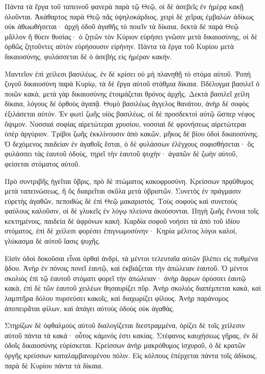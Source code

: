 {Πάντα τὰ ἔργα τοῦ ταπεινοῦ φανερὰ παρὰ τῷ Θεῷ, οἱ δὲ ἀσεβεῖς ἐν ἡμέρᾳ κακῇ ὀλοῦνται.
Ἀκάθαρτος παρὰ Θεῷ πᾶς ὑψηλοκάρδιος, χειρὶ δὲ χεῖρας ἐμβαλὼν ἀδίκως οὐκ ἀθωωθήσεται·
ἀρχὴ ὁδοῦ ἀγαθῆς τὸ ποιεῖν τὰ δίκαια, δεκτὰ δὲ παρὰ Θεῷ μᾶλλον ἢ θύειν θυσίας·
ὁ ζητῶν τὸν Κύριον εὑρήσει γνῶσιν μετὰ δικαιοσύνης, οἱ δὲ ὀρθῶς ζητοῦντες αὐτὸν εὑρήσουσιν εἰρήνην.
Πάντα τὰ ἔργα τοῦ Κυρίου μετὰ δικαιοσύνης, φυλάσσεται δὲ ὁ ἀσεβὴς εἰς ἡμέραν κακήν.
\par }{\PP {}Μαντεῖον ἐπὶ χείλεσι βασιλέως, ἐν δὲ κρίσει οὐ μὴ πλανηθῇ τὸ στόμα αὐτοῦ.
Ῥοπὴ ζυγοῦ δικαιοσύνη παρὰ Κυρίῳ, τὰ δὲ ἔργα αὐτοῦ στάθμια δίκαια.
Βδέλυγμα βασιλεῖ ὁ ποιῶν κακὰ, μετὰ γὰρ δικαιοσύνης ἑτοιμάζεται θρόνος ἀρχῆς.
Δεκτὰ βασιλεῖ χείλη δίκαια, λόγους δέ ὀρθοὺς ἀγαπᾷ.
Θυμὸ βασιλέως ἄγγελος θανάτου, ἀνὴρ δὲ σοφὸς ἐξιλάσεται αὐτόν.
Ἐν φωτὶ ζωῆς υἱὸς βασιλέως, οἱ δὲ προσδεκτοὶ αὐτῷ ὥσπερ νέφος ὄψιμον.
Νοσσιαὶ σοφίας αἱρετώτεραι χρυσίου, νοσσιαὶ δὲ φρονήσεως αἱρετώτεραι ὑπὲρ ἀργύριον.
Τρίβοι ζωῆς ἐκκλίνουσιν ἀπὸ κακῶν, μῆκος δὲ βίου ὁδοὶ δικαιοσύνης. Ὁ δεχόμενος παιδείαν ἐν ἀγαθοῖς ἔσται, ὁ δὲ φυλάσσων ἐλέγχους σοφισθήσεται· ὃς φυλάσσει τὰς ἑαυτοῦ ὁδοὺς, τηρεῖ τὴν ἑαυτοῦ ψυχήν· ἀγαπῶν δὲ ζωὴν αὐτοῦ, φείσεται στόματος αὐτοῦ.
\par }{\PP {}Πρὸ συντριβῆς ἡγεῖται ὕβρις, πρὸ δὲ πτώματος κακοφροσύνη.
Κρείσσων πρᾳΰθυμος μετὰ ταπεινώσεως, ἢ ὃς διαιρεῖται σκῦλα μετὰ ὑβριστῶν.
Συνετὸς ἐν πράγμασιν εὑρετὴς ἀγαθῶν, πεποιθὼς δὲ ἐπὶ Θεῷ μακαριστός.
Τοὺς σοφοὺς καὶ συνετοὺς φαύλους καλοῦσιν, οἱ δὲ γλυκεῖς ἐν λόγῳ πλείονα ἀκούσονται.
Πηγὴ ζωῆς ἔννοια τοῖς κεκτημένοις, παιδεία δὲ ἀφρόνων κακή.
Καρδία σοφοῦ νοήσει τὰ ἀπὸ τοῦ ἰδίου στόματος, ἐπὶ δὲ χείλεσι φορέσει ἐπιγνωμοσύνην·
Κηρία μέλιτος λόγοι καλοί, γλύκασμα δὲ αὐτοῦ ἴασις ψυχῆς.
\par }{\PP {}Εἰσὶν ὁδοὶ δοκοῦσαι εἶναι ὀρθαὶ ἀνδρὶ, τὰ μέντοι τελευταῖα αὐτῶν βλέπει εἰς πυθμένα ᾅδου.
Ἀνὴρ ἐν πόνοις πονεῖ ἑαυτῷ, καὶ ἐκβιάζεται τὴν ἀπώλειαν ἑαυτοῦ. Ὁ μέντοι σκολιὸς ἐπὶ τῷ ἑαυτοῦ στόματι φορεῖ τὴν ἀπώλειαν·
ἀνὴρ ἄφρων ὀρύσσει ἑαυτῷ κακὰ, ἐπὶ δὲ τῶν ἑαυτοῦ χειλέων θησαυρίζει πῦρ.
Ἀνὴρ σκολιὸς διαπέμπεται κακὰ, καὶ λαμπτῆρα δόλου πυρσεύσει κακοῖς, καὶ διαχωρίζει φίλους.
Ἀνὴρ παράνομος ἀποπειρᾶται φίλων, καὶ ἀπάγει αὐτοὺς ὁδοὺς οὐκ ἀγαθάς.
\par }{\PP {}Στηρίζων δὲ ὀφθαλμοὺς αὐτοῦ διαλογίζεται διεστραμμένα, ὁρίζει δὲ τοῖς χείλεσιν αὐτοῦ πάντα τὰ κακά· οὗτος κάμινός ἐστι κακίας.
Στέφανος καυχήσεως γῆρας, ἐν δὲ ὁδοῖς δικαιοσύνης εὑρίσκεται.
Κρείσσων ἀνὴρ μακρόθυμος ἰσχυροῦ, ὁ δὲ κρατῶν ὀργῆς κρείσσων καταλαμβανομένου πόλιν.
Εἰς κόλπους ἐπέρχεται πάντα τοῖς ἀδίκοις, παρὰ δὲ Κυρίου πάντα τὰ δίκαια.

}
